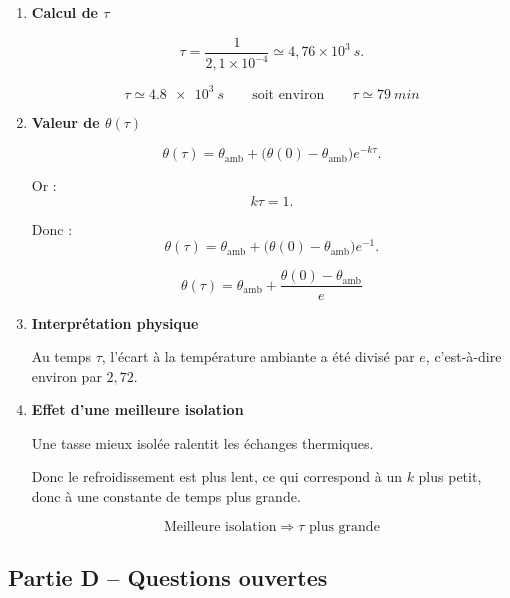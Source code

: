 \documentclass[11pt,a4paper]{article}
\begin{document}
\begin{enumerate}[label=\textbf{2.\arabic*}, resume, leftmargin=1.6em]

\item \textbf{Calcul de \(\tau\)}

\[
\tau=\frac{1}{2{,}1\times 10^{-4}}
\simeq 4{,}76\times 10^3\ \si{s}.
\]

\[
\boxed{\tau\simeq \SI{4,8e3}{s}}
\qquad\text{soit environ}\qquad
\boxed{\tau\simeq \SI{79}{min}}
\]

\item \textbf{Valeur de \(\theta(\tau)\)}

\[
\theta(\tau)=\theta_{\mathrm{amb}}+\big(\theta(0)-\theta_{\mathrm{amb}}\big)e^{-k\tau}.
\]

Or :
\[
k\tau=1.
\]

Donc :
\[
\theta(\tau)=\theta_{\mathrm{amb}}+\big(\theta(0)-\theta_{\mathrm{amb}}\big)e^{-1}.
\]

\[
\boxed{
\theta(\tau)=\theta_{\mathrm{amb}}+\frac{\theta(0)-\theta_{\mathrm{amb}}}{e}
}
\]

\item \textbf{Interprétation physique}

Au temps \(\tau\), l’écart à la température ambiante a été divisé par \(e\), c’est-à-dire environ par \(2{,}72\).

\item \textbf{Effet d’une meilleure isolation}

Une tasse mieux isolée ralentit les échanges thermiques.

Donc le refroidissement est plus lent, ce qui correspond à un \(k\) plus petit, donc à une constante de temps plus grande.

\[
\boxed{\text{Meilleure isolation} \Longrightarrow \tau \text{ plus grande}}
\]

\end{enumerate}

\subsection*{Partie D -- Questions ouvertes}
\end{document}
